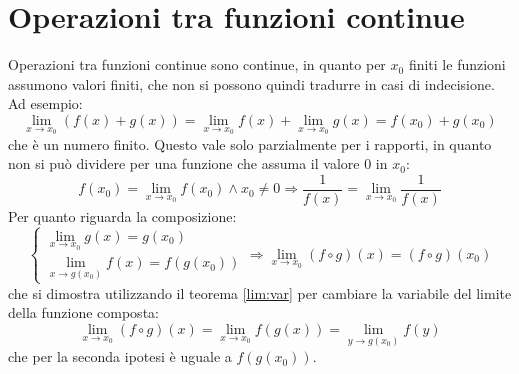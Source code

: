 \section{Operazioni tra funzioni continue}
Operazioni tra funzioni continue sono continue, in quanto per $x_0$ finiti le funzioni assumono valori finiti, che non si possono quindi tradurre in casi di indecisione. Ad esempio:
\[
	\lim_{x\to x_0} (f(x)+g(x))=\lim_{x\to x_0} f(x)+\lim_{x\to x_0} g(x)=f(x_0)+g(x_0)
\]
che è un numero finito. Questo vale solo parzialmente per i rapporti, in quanto non si può dividere per una funzione che assuma il valore $0$ in $x_0$:
\[
	f(x_0)=\lim_{x \to x_0} f(x_0) \land x_0 \neq 0\Rightarrow \frac{1}{f(x)}=\lim_{x\to x_0} \frac{1}{f(x)}
\]
Per quanto riguarda la composizione:
\[
	\begin{cases}
		\lim_{x\to x_0} g(x)=g(x_0) \\
		\lim_{x\to g(x_0)} f(x)=f(g(x_0))
	\end{cases}\Rightarrow
	\lim_{x\to x_0} (f\circ g)(x)=(f\circ g)(x_0)
\]
che si dimostra utilizzando il teorema \ref{lim:var} per cambiare la variabile del limite della funzione composta:
\[
	\lim_{x\to x_0} (f\circ g)(x)=\lim_{x\to x_0} f(g(x))=\lim_{y\to g(x_0)} f(y)
\]
che per la seconda ipotesi è uguale a $f(g(x_0))$.
